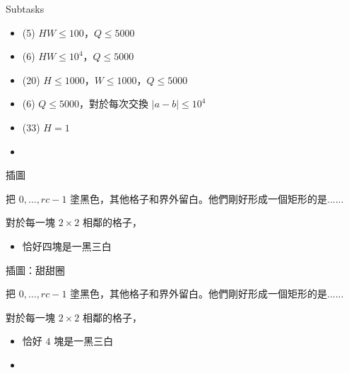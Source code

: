 \begin{frame}{}
    \begin{problem}
        Subtasks

        \begin{itemize}
            \item (5) $HW \le 100$，$Q \le 5000$
            \item (6) $HW \le 10^4$，$Q \le 5000$
            \item (20) $H \le 1000$，$W \le 1000$，$Q \le 5000$
            \item (6) $Q \le 5000$，對於每次交換 $|a - b| \le 10^4$
            \item (33) $H = 1$
            \item {}
        \end{itemize}
    \end{problem}

\end{frame}

\begin{frame}{}
    \todo 插圖
\end{frame}

\begin{frame}{}
    把 $0, \dots, rc - 1$ 塗黑色，其他格子和界外留白。他們剛好形成一個矩形的是......

     {
        對於每一塊 $2 \times 2$ 相鄰的格子，
        \begin{itemize}
            \item 恰好四塊是一黑三白
        \end{itemize}
    }
\end{frame}

\begin{frame}{}
    \todo 插圖：甜甜圈
\end{frame}

\begin{frame}{}
    把 $0, \dots, rc - 1$ 塗黑色，其他格子和界外留白。他們剛好形成一個矩形的是......

    對於每一塊 $2 \times 2$ 相鄰的格子，
    \begin{itemize}
        \item 恰好 $4$ 塊是一黑三白
        \item {}
    \end{itemize}
\end{frame}

